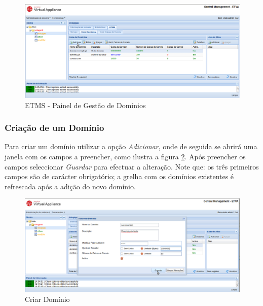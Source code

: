 \begin{figure}[H]
    \begin{center}
    \includegraphics[scale=0.35]{screenshots/etms/etms_criar_dominio_1.png}
    \caption{ETMS - Painel de Gestão de Domínios}
    \label{fig:etms_criar_dominio_1}
    \end{center}
\end{figure}

\subsubsection{Criação de um Domínio}
\label{sec:etms_sub_criacao_dominio}

Para criar um domínio utilizar a opção \textit{Adicionar}, onde de seguida se abrirá uma janela com os campos a preencher, como ilustra a figura \ref{fig:etms_criar_dominio_2}. Após preencher os campos seleccionar \textit{Guardar} para efectuar a alteração. Note que: os três primeiros campos são de carácter obrigatório; a grelha com os domínios existentes é refrescada após a adição do novo domínio.

\begin{figure}[H]
    \begin{center}
    \includegraphics[scale=0.35]{screenshots/etms/etms_criar_dominio_2.png}
    \caption{Criar Domínio}
    \label{fig:etms_criar_dominio_2}
    \end{center}
\end{figure}

